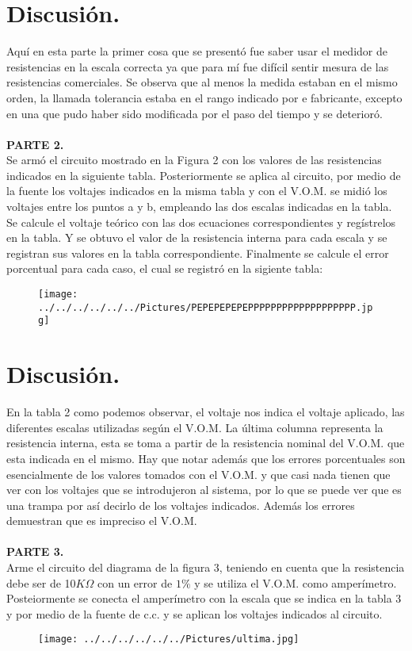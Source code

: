 \documentclass[11pt,a4paper]{article}
\begin{document}
\section*{Discusi\'{o}n.}
Aqu\'{i} en esta parte la primer cosa que se present\'{o} fue saber usar el medidor de resistencias en la escala correcta ya que para m\'{i} fue dif\'{i}cil sentir mesura de las resistencias comerciales. Se observa que al menos la medida estaban en el mismo orden, la llamada tolerancia estaba en el rango indicado por e fabricante, excepto en una que pudo haber sido modificada por el paso del tiempo y se deterior\'{o}. \\
\\
\textbf{PARTE 2.}\\
Se arm\'{o} el circuito mostrado en la Figura 2 con los valores de las resistencias indicados en la siguiente tabla. Posteriormente  se aplica al circuito, por medio de la fuente los voltajes indicados en la misma tabla y con el V.O.M. se midi\'{o} los voltajes entre los puntos a y b, empleando las dos escalas indicadas en la tabla. Se calcule el voltaje te\'{o}rico con las dos ecuaciones correspondientes y reg\'{i}strelos en la tabla. Y se obtuvo el valor de la resistencia interna para cada escala y  se registran sus valores en la tabla correspondiente. Finalmente se calcule el error porcentual para cada caso, el cual se registr\'{o} en la sigiente tabla: 
\begin{figure}[hbtp]
\centering
\texttt{[image: ../../../../../../Pictures/PEPEPEPEPEPPPPPPPPPPPPPPPPPPP.jpg]}
\end{figure}

\section*{Discusi\'{o}n.}
En la tabla 2 como podemos observar, el voltaje nos indica el voltaje aplicado, las diferentes escalas utilizadas según el V.O.M. La \'{u}ltima columna representa la resistencia interna, esta se toma a partir de la resistencia nominal del V.O.M. que esta indicada en el mismo. Hay que notar adem\'{a}s que los errores porcentuales son esencialmente de los valores tomados con el V.O.M. y que casi nada tienen que ver con los voltajes que se introdujeron al sistema, por lo que se puede ver que es una trampa por as\'{i} decirlo de los voltajes indicados. Adem\'{a}s los errores demuestran que es impreciso el V.O.M.
\\
\\
\textbf{PARTE 3.}\\
Arme el circuito del diagrama de la figura 3, teniendo en cuenta que la resistencia debe ser de 10$K\Omega $ con un error de $1\%$ y se utiliza el V.O.M. como amper\'{i}metro. Posteiormente se conecta el amper\'{i}metro con la escala que se indica en la tabla 3 y por medio de la fuente de c.c. y se aplican los voltajes indicados al circuito.
\begin{figure}[hbtp]
\centering
\texttt{[image: ../../../../../../Pictures/ultima.jpg]}
\end{figure}
\end{document}

